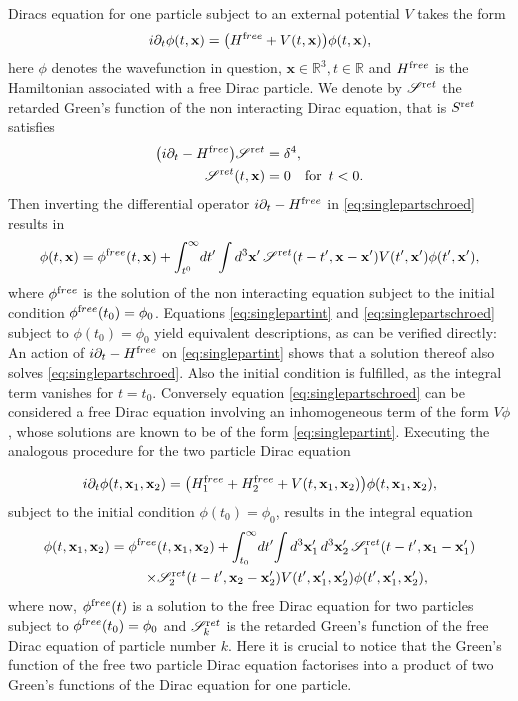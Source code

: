 \documentclass[b5paper,draft,openbib,12pt]{memoir}
\newcommand{\vx}{\mathbf{x}}
\newcommand{\ret}{{\textup ret}}
\newcommand{\free}{{\textup free}}
\begin{document}
Diracs equation for one particle subject to an 
external potential \(V\) takes the form
\begin{equation}
	i \partial_t \phi(t,\vx) = \big( H^\free + V(t,\vx) \big) \phi(t,\vx),
	\label{eq:singlepartschroed}
\end{equation}
here \(\phi\) denotes the wavefunction in question, \(\vx\in\mathbb{R}^3, t\in\mathbb{R}\)
and \(H^\free\) is the Hamiltonian associated with a free Dirac particle.
We denote by \(\mathscr{S}^\ret\) the retarded Green's function of the non interacting Dirac equation,
that is \(S^\ret\) satisfies
\begin{align}\label{eq:schroedgreensfn}
  \big( i \partial_t - H^\free \big) \mathscr{S}^\ret &= \delta^4,\\
  \mathscr{S}^\ret(t,\vx) &= 0 \quad \text{for }\, t<0.
\end{align}
Then inverting the differential operator \(i\partial_t -H^\free\) in  \eqref{eq:singlepartschroed}
results in 
\begin{equation}
	\phi(t,\vx) = \phi^\free(t,\vx) + \int_{t^0}^\infty \! dt' \int d^3 \vx' \, \mathscr{S}^\ret(t-t',\vx-\vx') V(t',\vx') \phi(t',\vx'),
	\label{eq:singlepartint}
\end{equation}
where $\phi^\free$ 
is the solution of the non interacting equation subject to the 
initial condition \(\phi^\free(t_0)=\phi_0\). 
Equations \eqref{eq:singlepartint} and \eqref{eq:singlepartschroed} subject to 
\(\phi(t_0)=\phi_0\) yield equivalent 
descriptions, as can be verified directly: An action of \(i\partial_t -H^\free\) on 
\eqref{eq:singlepartint} shows that a solution thereof also solves \eqref{eq:singlepartschroed}.
Also the initial condition is fulfilled, as the integral term vanishes for \(t=t_0\).
Conversely equation \eqref{eq:singlepartschroed} can be considered a free Dirac equation 
involving an inhomogeneous term of the form \(V \phi\), whose solutions are known to be
of the form \eqref{eq:singlepartint}.
Executing the analogous procedure for the two particle Dirac equation

\begin{equation}
	i \partial_t \phi(t,\vx_1,\vx_2) = \big(H_1^\free + H_2^\free + V(t,\vx_1,\vx_2)\big) \phi(t,\vx_1,\vx_2),
	\label{eq:twopartschroed}
\end{equation}
subject to the initial condition  \(\phi(t_0)=\phi_0\), 
results in the integral equation
\begin{align}
	\phi(t,\vx_1,\vx_2) = \phi^\free&(t,\vx_1,\vx_2) + \int_{t_0}^\infty \! dt' \! \int d^3 \vx_1'\,  d^3 \vx_2'\, \mathscr{S}_1^\ret(t-t',\vx_1-\vx_1') \nonumber\\
	\times&\mathscr{S}_2^\ret(t-t',\vx_2-\vx_2') V(t',\vx_1',\vx_2') \phi(t',\vx_1',\vx_2'),
	\label{eq:twopartschroedint}
\end{align}
where  now,
$\phi^\free(t)$ is a solution to the free Dirac 
equation for two particles subject
to \(\phi^\free (t_0)=\phi_0\) and \(\mathscr{S}_k^\ret\) is 
the retarded Green's function
of the free Dirac equation of particle number \(k\). 
Here it is crucial to notice that
the Green's function of the free two particle Dirac equation 
factorises into a product 
of two Green's functions of the Dirac equation for one particle.
\end{document}
